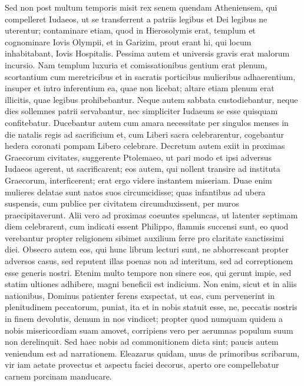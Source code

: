 \begin{biblechapter}
\begin{biblechapter}
\begin{biblechapter}
\begin{biblechapter}
\begin{biblechapter}
\begin{biblechapter}
\verse Sed non post multum temporis misit rex senem quendam Atheniensem, qui compelleret Iudaeos, ut se transferrent a patriis legibus et Dei legibus ne uterentur; 
\verse contaminare etiam, quod in Hierosolymis erat, templum et cognominare Iovis Olympii, et in Garizim, prout erant hi, qui locum inhabitabant, Iovis Hospitalis. 
\verse Pessima autem et universis gravis erat malorum incursio. 
\verse Nam templum luxuria et comissationibus gentium erat plenum, scortantium cum meretricibus et in sacratis porticibus mulieribus adhaerentium, insuper et intro inferentium ea, quae non licebat; 
\verse altare etiam plenum erat illicitis, quae legibus prohibebantur. 
\verse Neque autem sabbata custodiebantur, neque dies sollemnes patrii servabantur, nec simpliciter Iudaeum se esse quisquam confitebatur. 
\verse Ducebantur autem cum amara necessitate per singulos menses in die natalis regis ad sacrificium et, cum Liberi sacra celebrarentur, cogebantur hedera coronati pompam Libero celebrare. 
 \verse Decretum autem exiit in proximas Graecorum civitates, suggerente Ptolemaeo, ut pari modo et ipsi adversus Iudaeos agerent, ut sacrificarent; 
\verse eos autem, qui nollent transire ad instituta Graecorum, interficerent; erat ergo videre instantem miseriam. 
\verse Duae enim mulieres delatae sunt natos suos circumcidisse; quas infantibus ad ubera suspensis, cum publice per civitatem circumduxissent, per muros praecipitaverunt. 
\verse Alii vero ad proximas coeuntes speluncas, ut latenter septimam diem celebrarent, cum indicati essent Philippo, flammis succensi sunt, eo quod verebantur propter religionem sibimet auxilium ferre pro claritate sanctissimi diei.
 \verse Obsecro autem eos, qui hunc librum lecturi sunt, ne abhorrescant propter adversos casus, sed reputent illas poenas non ad interitum, sed ad correptionem esse generis nostri. 
\verse Etenim multo tempore non sinere eos, qui gerunt impie, sed statim ultiones adhibere, magni beneficii est indicium. 
\verse Non enim, sicut et in aliis nationibus, Dominus patienter ferens exspectat, ut eas, cum pervenerint in plenitudinem peccatorum, puniat, ita et in nobis statuit esse, 
\verse ne, peccatis nostris in finem devolutis, demum in nos vindicet; 
 \verse propter quod numquam quidem a nobis misericordiam suam amovet, corripiens vero per aerumnas populum suum non derelinquit. 
\verse Sed haec nobis ad commonitionem dicta sint; paucis autem veniendum est ad narrationem.
 \verse Eleazarus quidam, unus de primoribus scribarum, vir iam aetate provectus et aspectu faciei decorus, aperto ore compellebatur carnem porcinam manducare. 

\end{biblechapter}
\end{biblechapter}
\end{biblechapter}
\end{biblechapter}
\end{biblechapter}
\end{biblechapter}
